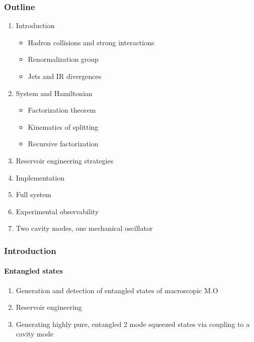 \documentclass[aspectratio=43]{beamer}
\begin{document}
\begin{frame}

	\frametitle{Outline}
	
	\begin{enumerate}
		\item {\color{blue}Introduction}
		\begin{itemize}
			\item Hadron collisions and strong interactions
			\item Renormalization group
			\item Jets and IR divergences
		\end{itemize}
		\item {\color{blue}System and Hamiltonian}
		\begin{itemize}
			\item Factorization theorem
			\item Kinematics of splitting
			\item Recursive factorization
		\end{itemize}
		\item {\color{blue}Reservoir engineering strategies}
		\item {\color{blue}Implementation}
		\item {\color{blue}Full system}
		\item {\color{blue}Experimental observability}
		\item {\color{blue}Two cavity modes, one mechanical oscillator}
	\end{enumerate}
	
\end{frame}

\begin{frame}

	\frametitle{Introduction}
	\framesubtitle{Entangled states}

	\begin{enumerate}
		\item Generation and detection of entangled states of macroscopic M.O
		\item Reservoir engineering 
		\item Generating highly pure, entangled 2 mode squeezed states via coupling to a cavity mode
	\end{enumerate}	
	
\end{frame}
\end{document}
